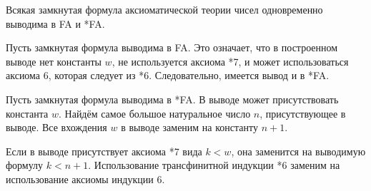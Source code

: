 \begin{theorem}
	Всякая замкнутая формула аксиоматической теории чисел одновременно выводима в FA и *FA.
\end{theorem}

\begin{iproof}
	\item Пусть замкнутая формула выводима в FA.
		Это означает, что в построенном выводе нет константы $ w $, не используется аксиома *7, и может использоваться аксиома 6, которая следует из *6.
		Следовательно, имеется вывод и в *FA.

	\item Пусть замкнутая формула выводима в *FA.
		В выводе может присутствовать константа $ w $.
		Найдём самое большое натуральное число $ n $, присутствующее в выводе.
		Все вхождения $ w $ в выводе заменим на константу $ n + 1 $.

		Если в выводе присутствует аксиома *7 вида $ k < w $, она заменится на выводимую формулу $ k < n + 1 $.
		Использование трансфинитной индукции *6 заменим на использование аксиомы индукции 6.
\end{iproof}
